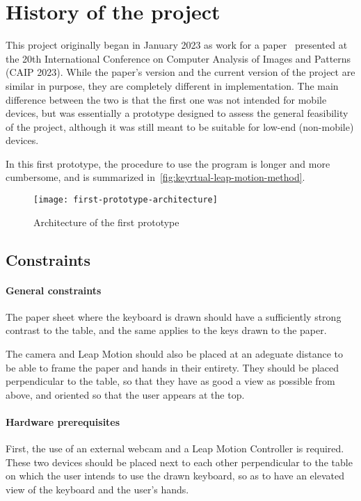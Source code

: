 \section{History of the project}\label{sec:history-of-the-project}
This project originally began in January 2023 as work for a paper~\cite{keyrtual} presented at the 20th International
Conference on Computer Analysis of Images and Patterns (CAIP 2023).
While the paper's version and the current version of the project are similar in purpose, they are completely different in implementation.
The main difference between the two is that the first one was not intended for mobile devices, but was essentially
a prototype designed to assess the general feasibility of the project,
although it was still meant to be suitable for low-end (non-mobile) devices.

In this first prototype, the procedure to use the program is longer and more cumbersome, and is summarized
in~\autoref{fig:keyrtual-leap-motion-method}.

\begin{figure}
	\center
	\texttt{[image: first-prototype-architecture]}
	\caption{Architecture of the first prototype}
	\label{fig:keyrtual-leap-motion-method}
\end{figure}

\subsection{Constraints}\label{subsec:constraints-prototype}

\paragraph{General constraints}
The paper sheet where the keyboard is drawn should have a sufficiently strong
contrast to the table, and the same applies to the keys drawn to the paper.

The camera and Leap Motion should also be placed at an adeguate distance
to be able to frame the paper and hands in their entirety.
They should be placed perpendicular to the table, so that they have as good a view as possible from above,
and oriented so that the user appears at the top.

\paragraph{Hardware prerequisites}
First, the use of an external webcam and a Leap Motion Controller is required.
These two devices should be placed next to each other perpendicular to the table on which the user intends to
use the drawn keyboard, so as to have an elevated view of the keyboard and the user's hands.

